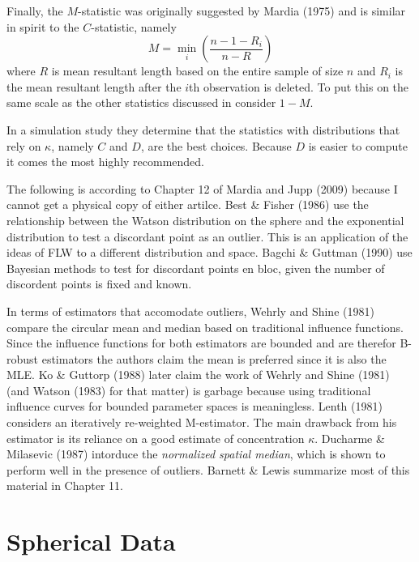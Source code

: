 \documentclass{article}\usepackage[]{graphicx}\usepackage[]{color}
\begin{document}
Finally, the $M$-statistic was originally suggested by Mardia (1975) \cite{mardia1975} and is similar in spirit to the $C$-statistic, namely
\[
M=\min_i\left(\frac{n-1-R_i}{n-R}\right)
\]
where $R$ is mean resultant length based on the entire sample of size $n$ and $R_i$ is the mean resultant length after the $i$th observation is deleted.  To put this on the same scale as the other statistics discussed in \cite{collett1980} consider $1-M$.

In a simulation study they determine that the statistics with distributions that rely on $\kappa$, namely $C$ and $D$, are the best choices.  Because $D$ is easier to compute it comes the most highly recommended.

The following is according to Chapter 12 of Mardia and Jupp (2009) \cite{mardia2009} because I cannot get a physical copy of either artilce.  Best \& Fisher (1986) \cite{best1986} use the relationship between the Watson distribution on the sphere and the exponential distribution to test a discordant point as an outlier.  This is an application of the ideas of FLW to a different distribution and space.  Bagchi \& Guttman (1990) \cite{bagchi1990} use Bayesian methods to test for discordant points en bloc, given the number of discordent points is fixed and known.  

In terms of estimators that accomodate outliers, Wehrly and Shine (1981) \cite{wehrly1981} compare the circular mean and median based on traditional influence functions.  Since the influence functions for both estimators are bounded and are therefor B-robust estimators the authors claim the mean is preferred since it is also the MLE.  Ko \& Guttorp (1988) \cite{ko1988} later claim the work of Wehrly and Shine (1981) (and Watson (1983) \cite{watson1983} for that matter) is garbage because using traditional influence curves for bounded parameter spaces is meaningless.  Lenth (1981) \cite{lenth1981} considers an iteratively re-weighted M-estimator.  The main drawback from his estimator is its reliance on a good estimate of concentration $\kappa$.  Ducharme \& Milasevic (1987) \cite{ducharme1987} intorduce the {\it normalized spatial median}, which is shown to perform well in the presence of outliers.  Barnett \& Lewis \cite{barnett1994} summarize most of this material in Chapter 11.


\section{Spherical Data}\label{sec:sphere}
\end{document}

